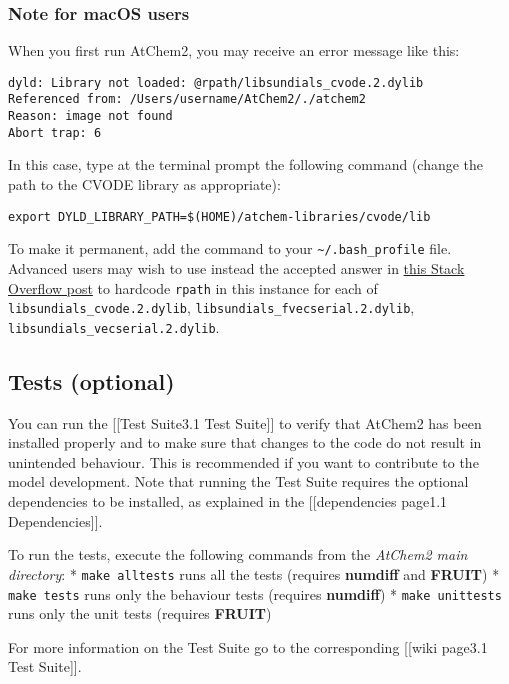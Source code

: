 \hypertarget{note-for-macos-users}{%
\subsubsection{Note for macOS users}\label{note-for-macos-users}}

When you first run AtChem2, you may receive an error message like this:

\begin{verbatim}
dyld: Library not loaded: @rpath/libsundials_cvode.2.dylib
Referenced from: /Users/username/AtChem2/./atchem2
Reason: image not found
Abort trap: 6
\end{verbatim}

In this case, type at the terminal prompt the following command (change
the path to the CVODE library as appropriate):

\begin{verbatim}
export DYLD_LIBRARY_PATH=$(HOME)/atchem-libraries/cvode/lib
\end{verbatim}

To make it permanent, add the command to your
\texttt{\textasciitilde{}/.bash\_profile} file. Advanced users may wish
to use instead the accepted answer in
\href{https://stackoverflow.com/questions/17703510/dyld-library-not-loaded-reason-image-not-loaded}{this
Stack Overflow post} to hardcode \texttt{rpath} in this instance for
each of \texttt{libsundials\_cvode.2.dylib},
\texttt{libsundials\_fvecserial.2.dylib},
\texttt{libsundials\_vecserial.2.dylib}.

\hypertarget{tests-optional}{%
\subsection{Tests (optional)}\label{tests-optional}}

You can run the {[}{[}Test Suite\textbar{}3.1 Test Suite{]}{]} to verify
that AtChem2 has been installed properly and to make sure that changes
to the code do not result in unintended behaviour. This is recommended
if you want to contribute to the model development. Note that running
the Test Suite requires the optional dependencies to be installed, as
explained in the {[}{[}dependencies page\textbar{}1.1
Dependencies{]}{]}.

To run the tests, execute the following commands from the \emph{AtChem2
main directory}: * \texttt{make\ alltests} runs all the tests (requires
\textbf{numdiff} and \textbf{FRUIT}) * \texttt{make\ tests} runs only
the behaviour tests (requires \textbf{numdiff}) *
\texttt{make\ unittests} runs only the unit tests (requires
\textbf{FRUIT})

For more information on the Test Suite go to the corresponding
{[}{[}wiki page\textbar{}3.1 Test Suite{]}{]}.
